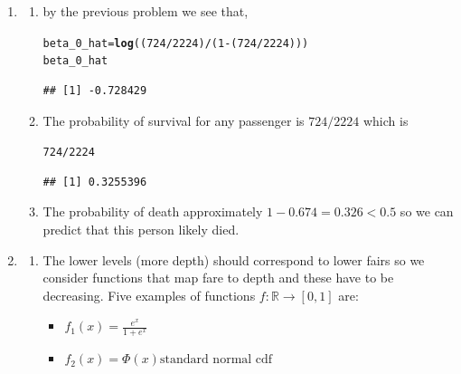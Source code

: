 \documentclass[12pt,english]{article}\usepackage[]{graphicx}\usepackage[]{xcolor}
\makeatletter
\newcommand{\hlnum}[1]{\textcolor[rgb]{0.686,0.059,0.569}{#1}}%
\newcommand{\hlopt}[1]{\textcolor[rgb]{0,0,0}{#1}}%
\newcommand{\hldef}[1]{\textcolor[rgb]{0.345,0.345,0.345}{#1}}%
\newcommand{\hlkwb}[1]{\textcolor[rgb]{0.69,0.353,0.396}{#1}}%
\newcommand{\hlkwd}[1]{\textcolor[rgb]{0.737,0.353,0.396}{\textbf{#1}}}%
\newenvironment{kframe}{%
 \def\at@end@of@kframe{}%
 \ifinner\ifhmode%
  \def\at@end@of@kframe{\end{minipage}}%
  \begin{minipage}{\columnwidth}%
 \fi\fi%
 \def\FrameCommand##1{\hskip\@totalleftmargin \hskip-\fboxsep
 \colorbox{shadecolor}{##1}\hskip-\fboxsep
     \hskip-\linewidth \hskip-\@totalleftmargin \hskip\columnwidth}%
 \MakeFramed {\advance\hsize-\width
   \@totalleftmargin\z@ \linewidth\hsize
   \@setminipage}}%
 {\par\unskip\endMakeFramed%
 \at@end@of@kframe}
\newenvironment{knitrout}{}{} %
\makeatother
\begin{document}
\begin{enumerate}[label=\arabic*.]
\begin{enumerate}[label=(\alph*)]
		\item From the previous part,a good guess for $p$ here would be $\bar{y}=3/5$ so the probability for them to to win their next match would be (as the outcomes are independent), $p=3/5$
	\end{enumerate}
\item \begin{enumerate}[label=(\alph*)]
		\item by the previous problem we see that,
\begin{knitrout}
\color{fgcolor}\begin{kframe}
\begin{alltt}
\hldef{beta_0_hat} \hlkwb{=} \hlkwd{log}\hldef{((}\hlnum{724}\hlopt{/}\hlnum{2224}\hldef{)}\hlopt{/}\hldef{(}\hlnum{1}\hlopt{-}\hldef{(}\hlnum{724}\hlopt{/}\hlnum{2224}\hldef{)))}
\hldef{beta_0_hat}
\end{alltt}
\begin{verbatim}
## [1] -0.728429
\end{verbatim}
\end{kframe}
\end{knitrout}
		\item The probability of survival for any passenger is $724/2224$ which is
\begin{knitrout}
\color{fgcolor}\begin{kframe}
\begin{alltt}
\hlnum{724}\hlopt{/}\hlnum{2224}
\end{alltt}
\begin{verbatim}
## [1] 0.3255396
\end{verbatim}
\end{kframe}
\end{knitrout}
		\item The probability of death approximately $1-0.674=0.326<0.5$ so we can predict that this person likely died.
\end{enumerate}
\item \begin{enumerate}[label=(\alph*)]
		\item The lower levels (more depth) should correspond to lower fairs so we consider functions that map fare to depth and these have to be decreasing. Five examples of functions $f: \mathbb{R} \to [0,1]$ are:
		\begin{itemize}
			\item $f_1(x) = \frac{e^x}{1+e^x}$ 
			\item $f_2(x) = \Phi(x) \text{standard normal cdf}$ 

\end{itemize}
\end{enumerate}
\end{enumerate}
\end{document}
